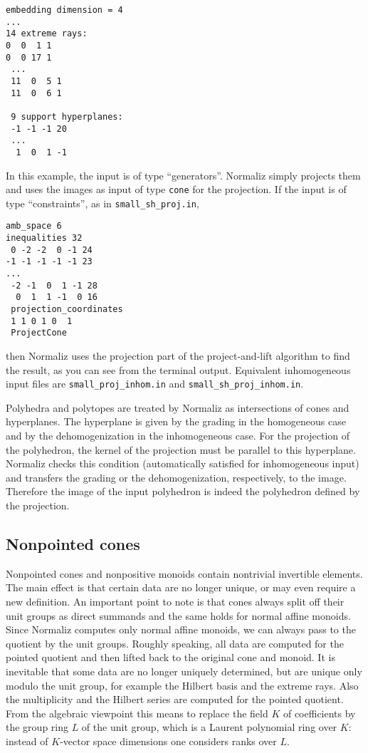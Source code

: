 \documentclass[12pt,a4paper]{scrartcl}
\theoremstyle{definition}
\begin{document}
{\begin{Verbatim}
embedding dimension = 4
...
14 extreme rays:
0  0  1 1
0  0 17 1
 ...
 11  0  5 1
 11  0  6 1
 
 9 support hyperplanes:
 -1 -1 -1 20
 ...
  1  0  1 -1
\end{Verbatim}
In this example, the input is of type ``generators''. Normaliz simply projects them and uses the images as input of type \verb|cone| for the projection. If the input is of type ``constraints'', as in \verb|small_sh_proj.in|, 
\begin{Verbatim}
amb_space 6
inequalities 32
 0 -2 -2  0 -1 24
-1 -1 -1 -1 -1 23
...
 -2 -1  0  1 -1 28
  0  1  1 -1  0 16
 projection_coordinates
 1 1 0 1 0  1
 ProjectCone
\end{Verbatim}
then Normaliz uses the projection part of the project-and-lift algorithm to find the result, as you can see from the terminal output. Equivalent inhomogeneous input files are \verb|small_proj_inhom.in| and \verb|small_sh_proj_inhom.in|.

Polyhedra and polytopes are treated by Normaliz as intersections of cones and hyperplanes. The hyperplane is given by the grading in the homogeneous case and by the dehomogenization in the inhomogeneous case. For the projection of the polyhedron, the kernel of the projection must be parallel to this hyperplane. Normaliz checks this condition (automatically satisfied for inhomogeneous input) and transfers the grading or the dehomogenization, respectively, to the image. Therefore the image of the input polyhedron is indeed the polyhedron defined by the projection.

\subsection{Nonpointed cones}\label{Nonpointed}

Nonpointed cones and nonpositive monoids contain nontrivial invertible elements. The main effect is that certain data are no longer unique, or may even require a new definition. An important point to note is that cones always split off their unit groups as direct summands and the same holds for normal affine monoids. Since Normaliz computes only normal affine monoids, we can always pass to the quotient by the unit groups. Roughly speaking, all data are computed for the pointed quotient and then lifted back to the original cone and monoid. It is inevitable that some data are no longer uniquely determined, but are unique only modulo the unit group, for example the Hilbert basis and the extreme rays. Also the multiplicity and the Hilbert series are computed for the pointed quotient. From the algebraic viewpoint this means to replace the field $K$ of coefficients by the group ring $L$ of the unit group, which is a Laurent polynomial ring over $K$: instead of $K$-vector space dimensions one considers ranks over $L$.

}
\end{document}
